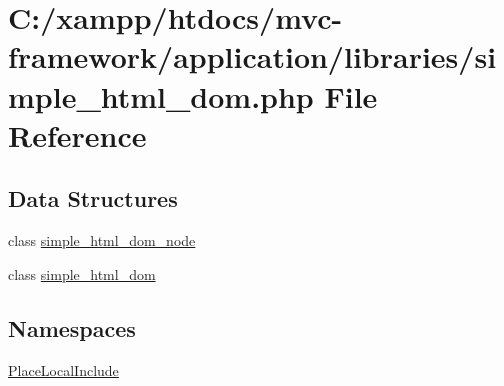 \hypertarget{simple__html__dom_8php}{}\section{C\+:/xampp/htdocs/mvc-\/framework/application/libraries/simple\+\_\+html\+\_\+dom.php File Reference}
\label{simple__html__dom_8php}
\subsection*{Data Structures}
\begin{DoxyCompactItemize}
\item 
class \hyperlink{classsimple__html__dom__node}{simple\+\_\+html\+\_\+dom\+\_\+node}
\item 
class \hyperlink{classsimple__html__dom}{simple\+\_\+html\+\_\+dom}
\end{DoxyCompactItemize}
\subsection*{Namespaces}
\begin{DoxyCompactItemize}
\item 
 \hyperlink{namespace_place_local_include}{Place\+Local\+Include}
\end{DoxyCompactItemize}
